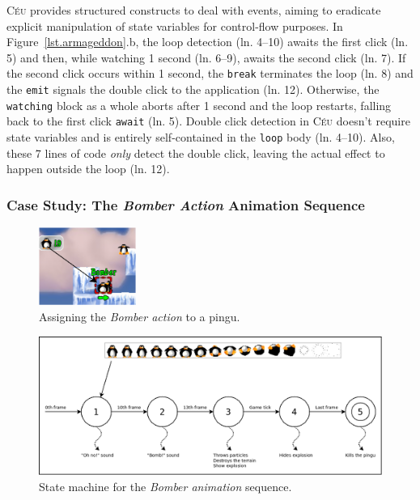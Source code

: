 \documentclass{vgtc}                          %
\newcommand{\CEU}{\textsc{C\'{e}u}\xspace}
\newcommand{\code}[1] {{\small{\texttt{#1}}}}
\begin{document}
\CEU provides structured constructs to deal with events, aiming to eradicate
explicit manipulation of state variables for control-flow purposes.
%
In Figure~\ref{lst.armageddon}.b, the loop detection (ln. 4--10) awaits the
first click (ln. 5) and then, while watching 1 second (ln. 6--9), awaits the
second click (ln. 7).
If the second click occurs within 1 second, the \code{break} terminates the
loop (ln. 8) and the \code{emit} signals the double click to the application
(ln. 12).
Otherwise, the \code{watching} block as a whole aborts after 1 second  and the
loop restarts, falling back to the first click \code{await} (ln. 5).
%
Double click detection in \CEU doesn't require state variables and is entirely
self-contained in the \code{loop} body (ln. 4--10).
Also, these 7 lines of code \emph{only} detect the double click, leaving the
actual effect to happen outside the loop (ln. 12).

\subsubsection{Case Study: The \emph{Bomber Action} Animation Sequence}
\label{sec.pats.fsms.2}


\begin{figure}[t]
\centering
\includegraphics[width=120px]{bomber-01}
\caption{ Assigning the \emph{Bomber action} to a pingu.
\label{fig.bomber.action}
}
\end{figure}

\begin{figure}[t]
\centering
\includegraphics[width=\columnwidth]{bomber-state}
\caption{ State machine for the \emph{Bomber animation} sequence.
\label{fig.bomber.fsm}
}
\end{figure}
\end{document}
